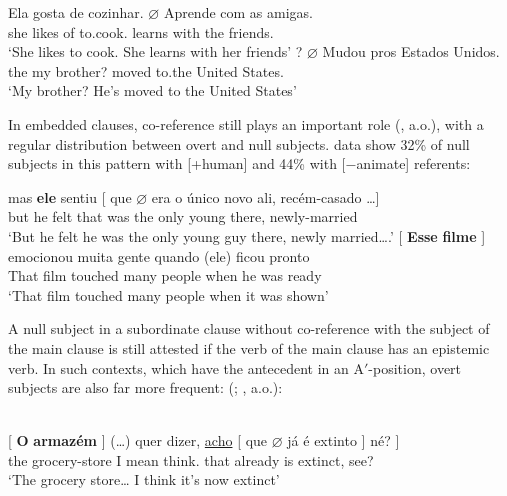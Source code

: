 \documentclass[output=paper]{langsci/langscibook}
\begin{document}
\ea%
    \label{ex:26.7}
    \ea
	\gll	Ela gosta de cozinhar. $\varnothing$ Aprende com as amigas.\\
    she likes of to.cook.      {}    learns    with the friends.\\
	\glt	\enquote*{She likes to cook. She learns with her friends}
    \ex
	? $\varnothing$  Mudou pros Estados Unidos.\\
    {} the my brother?  {} {}     moved to.the United States.\\
	\glt	\enquote*{My brother? He's moved to the United States}
    \z
\z

In embedded clauses, co-reference still plays an important role
(\citealt{Modesto2000,FigueiredoSilva2000,DuarteSoaresdaSilva2016}, a.o.), with
a regular distribution between overt and null subjects. 
data show 32\% of null subjects in this  pattern with [+human] and 44\%
with [$-$animate] referents:\largerpage[-1]

\ea%
    \label{ex:26.8}
    \ea
	\gll	mas \textbf{ele}\textbf{}  sentiu [ que
    $\varnothing$  era  o    único novo    ali,
    recém-casado \dots{}]\\
            but  he  felt   {} that {} was the only   young there, newly-married \\
	\glt	\enquote*{But he felt he was the only young guy there, newly married….}
    \ex
	\gll	{}[ \textbf{Esse} \textbf{filme} ] emocionou muita  gente   quando (ele) ficou pronto\\
            {} That film {} touched many  people  when \hphantom{(}he  was ready\\
	\glt	\enquote*{That film touched many  people when it was shown}
    \z
\z

A null subject in a subordinate clause without co-reference with the subject of
the main clause is still attested if the verb of the main clause has an
epistemic verb. In such contexts, which have the antecedent in an
A$'$-position, overt subjects are also far more frequent:
(\citealt{MoreiradaSilva1983};
\citealt{FigueiredoSilva1996,FigueiredoSilva2000}, a.o.):

\ea\label{ex:26.9}\\
    \gll	{}[ \textbf{O} \textbf{armazém} ] (\dots{}) {quer dizer,} \underline{acho} [ que $\varnothing$ já é extinto ] né? ]\\
    {} the grocery-store {} {} {I mean} think.\Fsg{} {} that {}  already is extinct, {} see?\\
    \glt	\enquote*{The grocery store\dots{} I think it's now extinct}
\z
\end{document}
